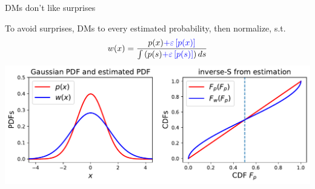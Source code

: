 
\begin{frame}{DMs don't like surprises}

To avoid surprises, DMs  to every estimated probability, then normalize, s.t.
\begin{equation}
	w(x)=\frac{p(x)\textcolor{blue}{+\varepsilon\left[p(x)\right]}}{\int \left(p(s) \textcolor{blue}{+\varepsilon\left[p(s)\right]} \right)ds}
\end{equation}
\pause
\centering
	\includegraphics[width=.9\textwidth]{../../figs/square_root_error_1Gaussian.pdf} \\
\end{frame}


